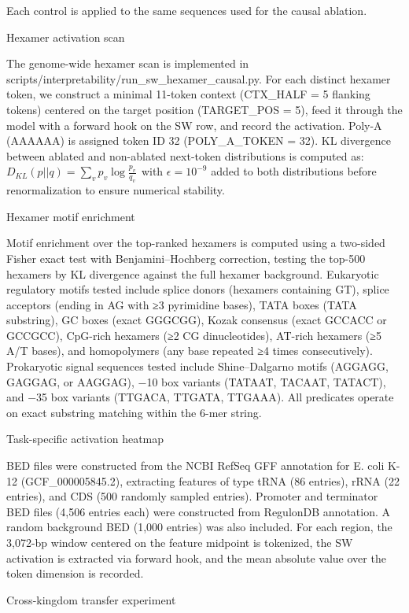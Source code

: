 \documentclass[11pt]{article}
\begin{document}
Each control is applied to the same sequences used for the causal
ablation.

Hexamer activation scan

The genome-wide hexamer scan is implemented in
scripts/interpretability/run\_sw\_hexamer\_causal.py. For each distinct
hexamer token, we construct a minimal 11-token context (CTX\_HALF = 5
flanking tokens) centered on the target position (TARGET\_POS = 5), feed
it through the model with a forward hook on the SW row, and record the
activation. Poly-A (AAAAAA) is assigned token ID 32 (POLY\_A\_TOKEN =
32). KL divergence between ablated and non-ablated next-token
distributions is computed as:\\
\(D_{KL}(p||q) = \sum_{v}^{}p_{v}\log\frac{p_{v}}{q_{v}}\ \ \)with
\(\epsilon = 10^{- 9}\) added to both distributions before
renormalization to ensure numerical stability.

Hexamer motif enrichment

Motif enrichment over the top-ranked hexamers is computed using a
two-sided Fisher exact test with Benjamini--Hochberg correction, testing
the top-500 hexamers by KL divergence against the full hexamer
background. Eukaryotic regulatory motifs tested include splice donors
(hexamers containing GT), splice acceptors (ending in AG with ≥3
pyrimidine bases), TATA boxes (TATA substring), GC boxes (exact GGGCGG),
Kozak consensus (exact GCCACC or GCCGCC), CpG-rich hexamers (≥2 CG
dinucleotides), AT-rich hexamers (≥5 A/T bases), and homopolymers (any
base repeated ≥4 times consecutively). Prokaryotic signal sequences
tested include Shine--Dalgarno motifs (AGGAGG, GAGGAG, or AAGGAG), −10
box variants (TATAAT, TACAAT, TATACT), and −35 box variants (TTGACA,
TTGATA, TTGAAA). All predicates operate on exact substring matching
within the 6-mer string.

Task-specific activation heatmap

BED files were constructed from the NCBI RefSeq GFF annotation for E.
coli K-12 (GCF\_000005845.2), extracting features of type tRNA (86
entries), rRNA (22 entries), and CDS (500 randomly sampled entries).
Promoter and terminator BED files (4,506 entries each) were constructed
from RegulonDB annotation. A random background BED (1,000 entries) was
also included. For each region, the 3,072-bp window centered on the
feature midpoint is tokenized, the SW activation is extracted via
forward hook, and the mean absolute value over the token dimension is
recorded.

Cross-kingdom transfer experiment
\end{document}
